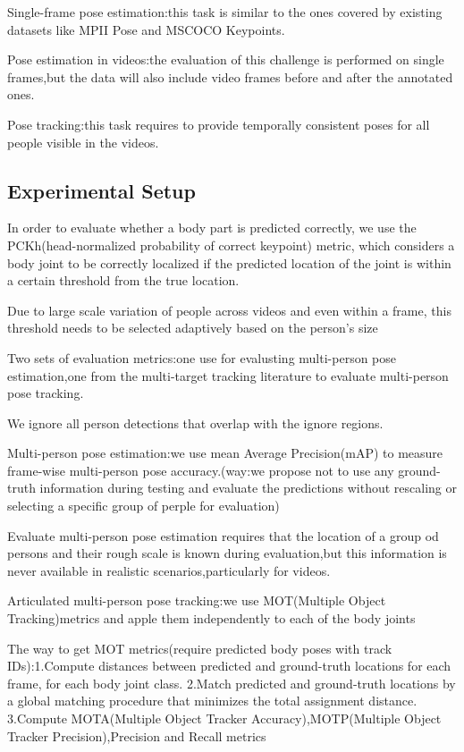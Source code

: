 \documentclass[11pt]{article}
\begin{document}
Single-frame pose estimation:this task is similar to the ones covered by existing datasets like MPII Pose and MSCOCO Keypoints.

Pose estimation in videos:the evaluation of this challenge is performed on single frames,but the data will also include video frames before and after the annotated ones.

Pose tracking:this task requires to provide temporally consistent poses for all people visible in the videos.
\subsection{Experimental Setup}

In order to evaluate whether a body part is predicted correctly, we use the PCKh(head-normalized probability of correct keypoint) metric, which considers a body joint to be correctly localized if the predicted location of the joint is within a certain threshold from the true location.

Due to large scale variation of people across videos and even within a frame, this threshold needs to be selected adaptively based on the person's size

Two sets of evaluation metrics:one use for evalusting multi-person pose estimation,one from the multi-target tracking literature to evaluate multi-person pose tracking.

We ignore all person detections that overlap with the ignore regions.

Multi-person pose estimation:we use mean Average Precision(mAP) to measure frame-wise multi-person pose accuracy.(way:we propose not to use any ground-truth information during testing and evaluate the predictions without rescaling or selecting a specific group of perple for evaluation)

Evaluate multi-person pose estimation requires that the location of a group od persons and their rough scale is known during evaluation,but this information is never available in realistic scenarios,particularly for videos.

Articulated multi-person pose tracking:we use MOT(Multiple Object Tracking)metrics and  apple them independently to each of the body joints

The way to get MOT metrics(require predicted body poses with track IDs):1.Compute distances between predicted and ground-truth locations for each frame, for each body joint class. 2.Match predicted and ground-truth locations by a global matching procedure that minimizes the total assignment distance. 3.Compute MOTA(Multiple Object Tracker Accuracy),MOTP(Multiple Object Tracker Precision),Precision and Recall metrics
\end{document}
